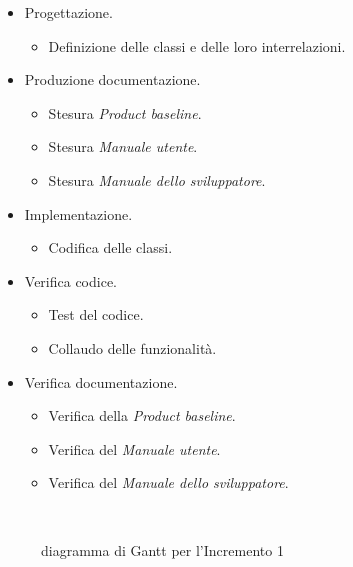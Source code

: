 \documentclass[../piano-di-progetto.tex]{subfiles}
\begin{document}
\begin{itemize}
  \item Progettazione.
  \begin{itemize}
    \item Definizione delle classi e delle loro interrelazioni.
  \end{itemize}
  \item Produzione documentazione.
  \begin{itemize}
    \item Stesura \textit{Product baseline}.
    \item Stesura \textit{Manuale utente}.
    \item Stesura \textit{Manuale dello sviluppatore}.
  \end{itemize}
  \item Implementazione.
  \begin{itemize}
    \item Codifica delle classi.
  \end{itemize}
  \item Verifica codice.
  \begin{itemize}
    \item Test del codice.
    \item Collaudo delle funzionalità.
  \end{itemize}
  \item Verifica documentazione.
  \begin{itemize}
    \item Verifica della \textit{Product baseline}.
    \item Verifica del \textit{Manuale utente}.
    \item Verifica del \textit{Manuale dello sviluppatore}.
  \end{itemize}
\end{itemize}
\begin{figure}[H]
  \centering
  
  \caption{diagramma di Gantt per l'Incremento 1}%
~~\label{fig:gantt_incremento_1}
\end{figure}
\end{document}
